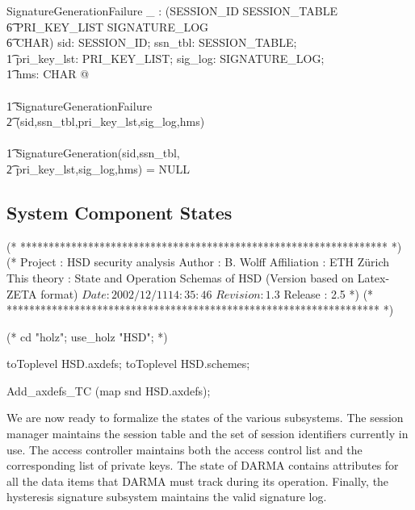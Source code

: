 \documentclass[a4paper,pdftex]{article}
\newenvironment{holz-ml}{\comment}{\endcomment}
\begin{document}
\begin{axdef}
SignatureGenerationFailure \_ : \power (SESSION\_ID \cross  SESSION\_TABLE \cross \\
\t6 PRI\_KEY\_LIST \cross SIGNATURE\_LOG  \cross\\
\t6   \seq CHAR)
\where
\forall sid: SESSION\_ID; ssn\_tbl: SESSION\_TABLE; \\
\t1 pri\_key\_lst: PRI\_KEY\_LIST; sig\_log: SIGNATURE\_LOG; \\
\t1 hms:  \seq CHAR @ \\
\\
\t1 SignatureGenerationFailure\\
\t2     (sid,ssn\_tbl,pri\_key\_lst,sig\_log,hms)\\
 \iff \\
\t1 SignatureGeneration(sid,ssn\_tbl,\\
\t2     pri\_key\_lst,sig\_log,hms) = NULL
\end{axdef}



\subsection{System Component States} \label{state-sec}


\begin{holz-ml}

(* ***************************************************************** *)
(*      Project         : HSD security analysis
        Author          : B. Wolff
        Affiliation     : ETH Z\"urich
        This theory     : State and Operation Schemas of HSD 
                          (Version based on Latex-ZETA format)
        $Date: 2002/12/11 14:35:46 $
        $Revision: 1.3 $
        Release         : 2.5                                         *)
(* ****************************************************************** *)

(* cd "holz"; 
   use_holz "HSD";
 *)

toToplevel HSD.axdefs;
toToplevel HSD.schemes;

Add_axdefs_TC (map snd HSD.axdefs);

\end{holz-ml}

We are now ready to formalize the states of the
various subsystems. The session manager maintains the session table
and the set of session identifiers currently in
use.  The access controller maintains both the access control list
and the corresponding list of private keys.  The state of DARMA
contains attributes for all the data items that DARMA must track
during its operation.  Finally, 
the hysteresis signature subsystem maintains the valid signature log.
\end{document}
